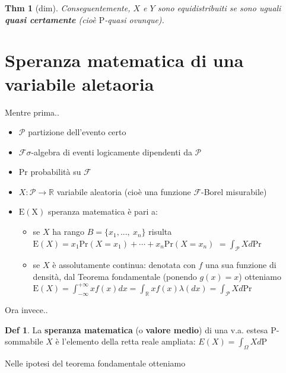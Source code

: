 \documentclass[a4paper,11pt]{article}
\theoremstyle{plain}
\newtheorem{thm}{Thm}[section]
\theoremstyle{definition}
\newtheorem{defn}{Def}[section]
\theoremstyle{remark}
\begin{document}
\begin{thm} [dim] Conseguentemente, $X$ e $Y$ sono equidistribuiti se sono
uguali \textbf{quasi certamente} (cioè $\mathrm{P}$-quasi ovunque).
\end{thm}



\section{Speranza matematica di una variabile aletaoria}
Mentre prima..

\begin{itemize}
    \item $\mathcal{P}$ partizione dell'evento certo
\item $\mathcal{F} \sigma$-algebra di eventi logicamente dipendenti da $\mathcal{P}$
\item $\mathrm{P}\mathrm{r}$ probabilit\`{a} su $\mathcal{F}$
\item  $X:\mathcal{P}\rightarrow \mathbb{R}$ variabile aleatoria (cio\`{e} una funzione $\mathcal{F}$-Borel misurabile)
\item $\mathrm{E}(\mathrm{X})$ speranza matematica  è pari a:
\begin{itemize}
    \item  se $X$ ha rango  $B=\{x_{1}, ... ,\ x_{n}\}$ risulta
$\mathrm{E}(X)=x_{1}\mathrm{P}\mathrm{r}(X=x_{1})+\cdots+x_{n}\mathrm{P}\mathrm{r}(X=x_{n})$ $=\displaystyle \int_{\mathcal{P}}Xd\mathrm{P}\mathrm{r}$
\item  se $X$ è assolutamente continua: denotata con $f$ una sua funzione di densit\`{a}, dal Teorema fondamentale (ponendo $g(x)=x$) otteniamo
$\mathrm{E}(X)=\displaystyle \int_{-\infty}^{+\infty}xf(x)dx=\displaystyle \int_{\mathbb{R}}xf(x)\lambda(dx)=\displaystyle \int_{\mathcal{P}}Xd\mathrm{P}\mathrm{r}$
\end{itemize}
\end{itemize}

\noindent
Ora invece..\\

\begin{defn}
La \textbf{speranza matematica} (o \textbf{valore medio}) di una v.a. estesa P-sommabile $X$ è l'elemento della retta reale ampliata: 
$\displaystyle E(X)= \int_{\Omega} X d \mathrm{P}$
\end{defn}

\noindent
Nelle ipotesi del teorema fondamentale otteniamo \\
\end{document}

